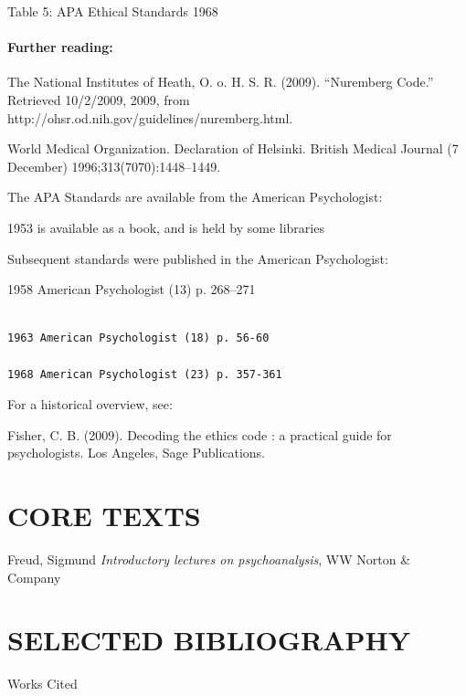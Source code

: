 Table 5: APA Ethical Standards 1968

\subsubsection{Further reading:}
\label{furtherreading:}

The National Institutes of Heath, O. o. H. S. R. (2009). ``Nuremberg Code.'' Retrieved 10\slash 2\slash 2009, 2009, from http:\slash \slash ohsr.od.nih.gov\slash guidelines\slash nuremberg.html.

World Medical Organization. Declaration of Helsinki. British Medical Journal (7 December) 1996;313(7070):1448--1449.

The APA Standards are available from the American Psychologist:

1953 is available as a book, and is held by some libraries

Subsequent standards were published in the American Psychologist:

1958 American Psychologist (13) p. 268--271

\begin{adjustwidth}{2.5em}{2.5em}
\begin{verbatim}

1963 American Psychologist (18) p. 56-60

1968 American Psychologist (23) p. 357-361

\end{verbatim}
\end{adjustwidth}

For a historical overview, see:

Fisher, C. B. (2009). Decoding the ethics code : a practical guide for psychologists. Los Angeles, Sage Publications.

\pagebreak 

\chapter{CORE TEXTS}
\label{coretexts}

Freud, Sigmund \emph{Introductory lectures on psychoanalysis}, WW Norton \& Company

\pagebreak 

\chapter{SELECTED BIBLIOGRAPHY}
\label{selectedbibliography}

Works Cited


